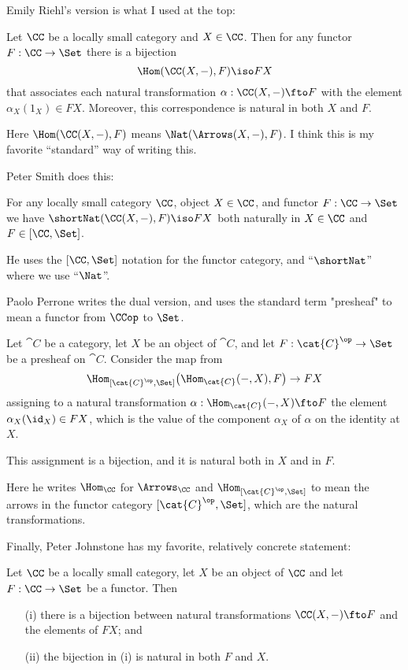 \pg
Emily Riehl's \cite{Riehl2016} version is what I used at the top:

\begin{lemma}[Yoneda]\label{yoneda-Riehl} Let $\CC$ be a locally small category and $X \in
\CC$. Then for any functor $F : \CC \to \Set$ there is a bijection
$$
\Hom(\CC(X,-), F) \iso FX
$$
that associates each natural transformation $\alpha:\CC(X,-) \fto F$ with the element
$\alpha_X(1_X) \in FX$. Moreover, this correspondence is natural in both $X$ and $F$.
\end{lemma}
\noindent
Here $\Hom(\CC(X,-), F)$ means $\Nat(\Arrows(X,-), F)$. I think this is my favorite
``standard'' way of writing this.

\pg
Peter Smith \cite{Smith} does this:

\begin{lemma}[Yoneda]\label{yoneda-smith} For any locally small category $\CC$, object $X
\in \CC$, and functor $F:\CC \to \Set$ we have  $\mathop{\shortNat}(\CC(X,-),F) \iso
FX$ both naturally in $X \in \CC$ and $F \in [\CC, \Set]$.
\end{lemma}
\noindent
He uses the $[\CC, \Set]$ notation for the functor category, and ``$\mathop{\shortNat}$''
where we use ``$\Nat$''.

\pg
Paolo Perrone \cite{Perrone} writes the dual version, and uses the standard term
"presheaf" to mean a functor from $\CCop$ to $\Set$.

\begin{lemma}[Yoneda]\label{yoneda-perrone} Let $\cat{C}$ be a category, let $X$ be an
 object of $\cat{C}$, and let $F:\cat{C}^\op\to\Set$ be a presheaf on $\cat{C}$. Consider
 the map from
 $$
 \Hom_{[\cat{C}^\op,\Set]} \bigl(\Hom_\cat{C} (-,X) , F \bigr) \to FX
 $$
 assigning to a natural transformation $\alpha:\Hom_\cat{C} (-,X)\fto F$ the element
 $\alpha_X(\id_X)\in FX$, which is the value of the component $\alpha_X$ of $\alpha$ on
 the identity at $X$. 

This assignment is a bijection, and it is natural both in $X$ and in $F$.
\end{lemma}
\noindent
Here he writes $\Hom_\CC$ for $\Arrows_\CC$ and $\Hom_{[\cat{C}^\op,\Set]}$ to mean the
arrows in the functor category $[\cat{C}^\op,\Set]$, which are the natural
transformations.

\bigskip
\noindent
Finally, Peter Johnstone \cite{Johnstone} has my favorite, relatively concrete statement:

\begin{lemma}[Yoneda]\label{yoneda-johnstone} Let $\CC$ be a locally small category, let
$X$ be an object of $\CC$ and let $F:\CC \to \Set$ be a functor. Then
\begin{enumerate}
\item[(i)]  there is a bijection between natural transformations $\CC(X, -) \fto F$ and the 
elements of $FX$; and

\item[(ii)] the bijection in (i) is natural in both $F$ and $X$.
\end{enumerate}

\end{lemma}

